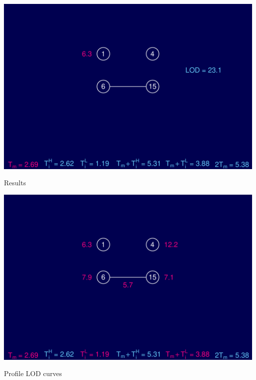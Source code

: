 \documentclass[12pt]{article}
\newcommand{\headsize}{\fontsize{35}{35} \selectfont}
\begin{document}
\vfill


\centerline{\includegraphics{FigsB/hyper_models2.pdf}}



\newpage

\addtocounter{page}{-1}

\headsize \color{myyellow}
\hfill \begin{minipage}{5.75in}
\centering
Results
\end{minipage}

\vfill


\centerline{\includegraphics{FigsB/hyper_models3.pdf}}


\newpage

\headsize \color{myyellow}
\hfill \begin{minipage}{5.75in}
\centering
Profile LOD curves
\end{minipage}
\end{document}
